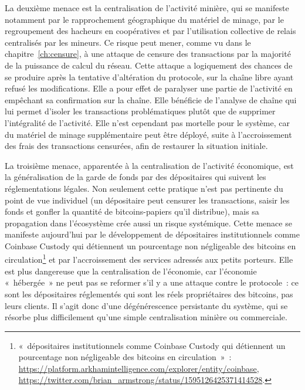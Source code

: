 La deuxième menace est la centralisation de l'activité minière, qui se manifeste notamment par le rapprochement géographique du matériel de minage, par le regroupement des hacheurs en coopératives et par l'utilisation collective de relais centralisés par les mineurs. Ce risque peut mener, comme vu dans le chapitre~\ref{ch:censure}, à une attaque de censure des transactions par la majorité de la puissance de calcul du réseau. Cette attaque a logiquement des chances de se produire après la tentative d'altération du protocole, sur la chaîne libre ayant refusé les modifications. Elle a pour effet de paralyser une partie de l'activité en empêchant sa confirmation sur la chaîne. Elle bénéficie de l'analyse de chaîne qui lui permet d'isoler les transactions problématiques plutôt que de supprimer l'intégralité de l'activité. Elle n'est cependant pas mortelle pour le système, car du matériel de minage supplémentaire peut être déployé, suite à l'accroissement des frais des transactions censurées, afin de restaurer la situation initiale. %

\clearpage
La troisième menace, apparentée à la centralisation de l'activité économique, est la généralisation de la garde de fonds par des dépositaires qui suivent les réglementations légales. Non seulement cette pratique n'est pas pertinente du point de vue individuel (un dépositaire peut censurer les transactions, saisir les fonds et gonfler la quantité de bitcoins-papiers qu'il distribue), mais sa propagation dans l'écosystème crée aussi un risque systémique. Cette menace se manifeste aujourd'hui par le développement de dépositaires institutionnels comme Coinbase Custody qui détiennent un pourcentage non négligeable des bitcoins en circulation\footnote{«~dépositaires institutionnels comme Coinbase Custody qui détiennent un pourcentage non négligeable des bitcoins en circulation~»~: \url{https://platform.arkhamintelligence.com/explorer/entity/coinbase}, \url{https://twitter.com/brian_armstrong/status/1595126425371414528}.} et par l'accroissement des services adressés aux petits porteurs. Elle est plus dangereuse que la centralisation de l'économie, car l'économie «~hébergée~» ne peut pas se reformer s'il y a une attaque contre le protocole~: ce sont les dépositaires réglementés qui sont les réels propriétaires des bitcoins, pas leurs clients. Il s'agit donc d'une dégénérescence persistante du système, qui se résorbe plus difficilement qu'une simple centralisation minière ou commerciale.

